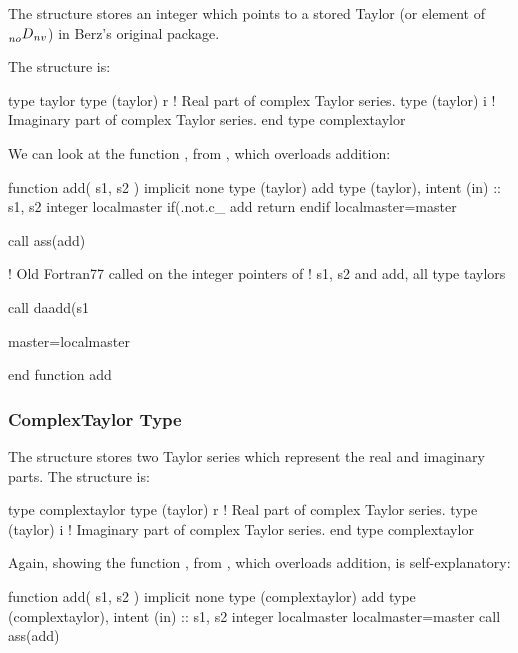 \documentclass{hitec}     %
\begin{document}
{{{{{{The  structure stores  an integer  which points to a stored Taylor (or element of $\prescript{}{no}{D}_{nv}$) in Berz's original package.

The structure is:
\begin{code}
type taylor
   type (taylor) r     ! Real part of complex Taylor series.
   type (taylor) i     ! Imaginary part of complex Taylor series.
end type complextaylor
\end{code}

We can look at the function , from , which overloads addition:

\begin{code}
  function add( s1, s2 )
    implicit none
    type (taylor) add
    type (taylor), intent (in) :: s1, s2
    integer localmaster
    if(.not.c_%
       add%
      return
    endif
    localmaster=master

    call ass(add)
    
 ! Old Fortran77 called on the integer pointers of 
 ! s1, s2 and add, all type taylors
 
    call daadd(s1%

    master=localmaster

  end function add
  \end{code}
  
\subsubsection{ComplexTaylor Type}
\label{s:ctaylor}

The  structure stores two Taylor series which represent the real and imaginary parts.
The structure is:
\begin{code}
type complextaylor
   type (taylor) r     ! Real part of complex Taylor series.
   type (taylor) i     ! Imaginary part of complex Taylor series.
end type complextaylor
\end{code}

Again, showing the function , from , which overloads addition, is self-explanatory:

\begin{code}
  function add( s1, s2 )
    implicit none
    type (complextaylor) add
    type (complextaylor), intent (in) :: s1, s2
    integer localmaster
    localmaster=master
    call ass(add)
    

\end{code}}}}}}}
\end{document}
